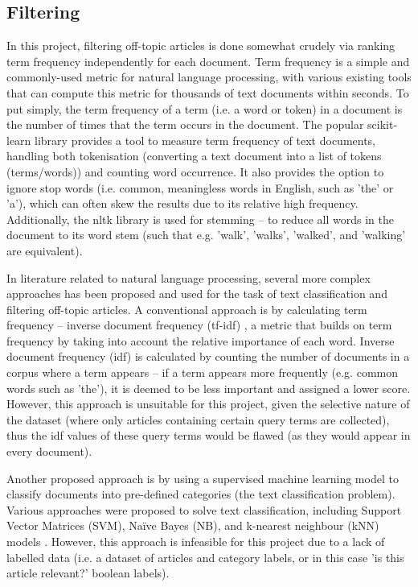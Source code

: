 \documentclass{report}
\begin{document}
\subsection{Filtering} \label{tc-filtering}
In this project, filtering off-topic articles is done somewhat crudely via ranking term frequency independently for each document.
Term frequency is a simple and commonly-used metric for natural language processing, with various existing tools that can compute this metric for thousands of text documents within seconds.
To put simply, the term frequency of a term (i.e. a word or token) in a document is the number of times that the term occurs in the document.
The popular scikit-learn library \cite{Scikit-learn} provides a tool to measure term frequency of text documents, handling both tokenisation (converting a text document into a list of tokens (terms/words)) and counting word occurrence.
It also provides the option to ignore stop words (i.e. common, meaningless words in English, such as 'the' or 'a'), which can often skew the results due to its relative high frequency.
Additionally, the nltk library \cite{Nltk} is used for stemming -- to reduce all words in the document to its word stem (such that e.g. 'walk', 'walks', 'walked', and 'walking' are equivalent).

In literature related to natural language processing, several more complex approaches has been proposed and used for the task of text classification and filtering off-topic articles.
A conventional approach is by calculating term frequency -- inverse document frequency (tf-idf) \cite{robertson2004understanding, sparck1972statistical}, a metric that builds on term frequency by taking into account the relative importance of each word.
Inverse document frequency (idf) is calculated by counting the number of documents in a corpus where a term appears -- if a term appears more frequently (e.g. common words such as 'the'), it is deemed to be less important and assigned a lower score.
However, this approach is unsuitable for this project, given the selective nature of the dataset (where only articles containing certain query terms are collected), thus the idf values of these query terms would be flawed (as they would appear in every document).

Another proposed approach is by using a supervised machine learning model to classify documents into pre-defined categories (the text classification problem).
Various approaches were proposed to solve text classification, including Support Vector Matrices (SVM), Na\"{i}ve Bayes (NB), and k-nearest neighbour (kNN) models \cite{khan2010review}.
However, this approach is infeasible for this project due to a lack of labelled data (i.e. a dataset of articles and category labels, or in this case 'is this article relevant?' boolean labels).
\end{document}
